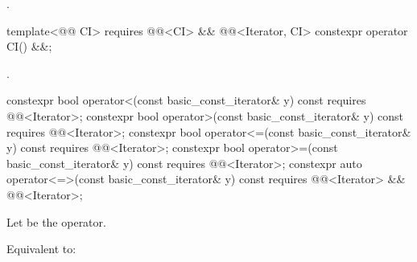 \begin{itemdescr}
\pnum
\returns
{}.
\end{itemdescr}

\begin{itemdecl}
template<@@ CI>
  requires @@<CI> && @@<Iterator, CI>
constexpr operator CI() &&;
\end{itemdecl}

\begin{itemdescr}
\pnum
\returns
{}.
\end{itemdescr}

%
%
%
%
%
\begin{itemdecl}
constexpr bool operator<(const basic_const_iterator& y) const
  requires @@<Iterator>;
constexpr bool operator>(const basic_const_iterator& y) const
  requires @@<Iterator>;
constexpr bool operator<=(const basic_const_iterator& y) const
  requires @@<Iterator>;
constexpr bool operator>=(const basic_const_iterator& y) const
  requires @@<Iterator>;
constexpr auto operator<=>(const basic_const_iterator& y) const
  requires @@<Iterator> && @@<Iterator>;
\end{itemdecl}

\begin{itemdescr}
\pnum
Let  be the operator.

\pnum
\effects
Equivalent to:
\end{itemdescr}

